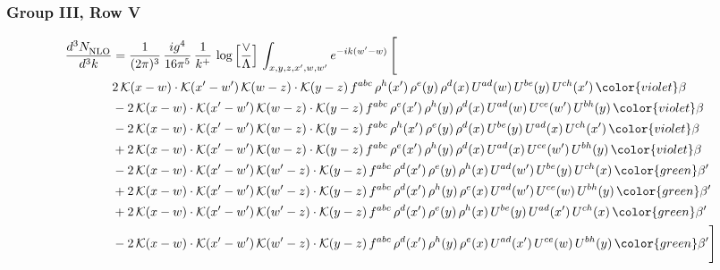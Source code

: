 \subsubsection{Group III, Row V}     
\begin{align}
     \frac{d^{3}N_{\rm NLO}^{\rm}}{d^{3}k}  & = \frac{1}{(2\pi)^{3}}\, \frac{ig^{4}}{16\pi^{5}}\, \frac{1}{k^{+}}\, \log{\left[\frac{\vee}{\Lambda}\right]}\, \int_{x,y,z,x^{\prime},w,w^{\prime}}e^{-ik(w^{\prime}-w)}\, \Bigg[\notag \\ & 2\,\mathcal{K}(x-w)\cdot\mathcal{K}(x'-w')\,\mathcal{K}(w-z)\cdot\mathcal{K}(y-z)\, f^{abc}\,\rho^{h}(x')\,\rho^{e}(y)\,\rho^{d}(x)\,U^{ad}(w)\,U^{be}(y)\,U^{ch}(x')\,{\color{violet}\beta}\notag\\ &-2\,\mathcal{K}(x-w)\cdot\mathcal{K}(x'-w')\,\mathcal{K}(w-z)\cdot\mathcal{K}(y-z)\, f^{abc}\,\rho^{e}(x')\,\rho^{h}(y)\,\rho^{d}(x)\,U^{ad}(w)\,U^{ce}(w')\,U^{bh}(y)\,{\color{violet}\beta} \notag\\ & -2\,\mathcal{K}(x-w)\cdot\mathcal{K}(x'-w')\,\mathcal{K}(w-z)\cdot\mathcal{K}(y-z)\, f^{abc}\,\rho^{h}(x')\,\rho^{e}(y)\,\rho^{d}(x)\,U^{be}(y)\,U^{ad}(x)\,U^{ch}(x')\,{\color{violet}\beta} \notag\\ &+2\,\mathcal{K}(x-w)\cdot\mathcal{K}(x'-w')\,\mathcal{K}(w-z)\cdot\mathcal{K}(y-z)\, f^{abc}\,\rho^{e}(x')\,\rho^{h}(y)\,\rho^{d}(x)\,U^{ad}(x)\,U^{ce}(w')\,U^{bh}(y)\,{\color{violet}\beta}\notag \\ & -2\, \mathcal{K}(x-w) \cdot \mathcal{K}(x'-w')\, \mathcal{K}(w'-z) \cdot \mathcal{K}(y-z)\, f^{abc}\, \rho^{d}(x')\,\rho^{e}(y)\, \rho^{h}(x)\,U^{ad}(w')\,U^{be}(y)\,U^{ch}(x)\, {\color{green} \beta'}\notag \\ & + 2\, \mathcal{K}(x-w) \cdot \mathcal{K}(x'-w')\, \mathcal{K}(w'-z) \cdot \mathcal{K}(y-z)\, f^{abc}\, \rho^{d}(x')\,\rho^{h}(y)\, \rho^{e}(x)\,U^{ad}(w')\,U^{ce}(w)\,U^{bh}(y)\, {\color{green} \beta'}\notag \\ & +2\, \mathcal{K}(x-w) \cdot \mathcal{K}(x'-w')\, \mathcal{K}(w'-z) \cdot \mathcal{K}(y-z)\, f^{abc}\, \rho^{d}(x')\,\rho^{e}(y)\, \rho^{h}(x)\,U^{be}(y)\,U^{ad}(x')\,U^{ch}(x)\, {\color{green} \beta'}\notag \\ & -2\, \mathcal{K}(x-w) \cdot \mathcal{K}(x'-w')\, \mathcal{K}(w'-z) \cdot \mathcal{K}(y-z)\, f^{abc}\, \rho^{d}(x')\,\rho^{h}(y)\, \rho^{e}(x)\,U^{ad}(x')\,U^{ce}(w)\,U^{bh}(y)\, {\color{green} \beta'}\Bigg]
     \end{align} 
